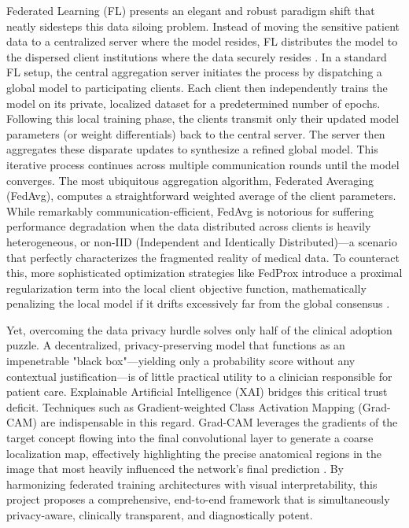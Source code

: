 \documentclass[12pt,a4paper]{report}
\begin{document}
Federated Learning (FL) presents an elegant and robust paradigm shift that neatly sidesteps this data siloing problem. Instead of moving the sensitive patient data to a centralized server where the model resides, FL distributes the model to the dispersed client institutions where the data securely resides \cite{mcmahan2017communication,rieke2020,sheller2020federated}. In a standard FL setup, the central aggregation server initiates the process by dispatching a global model to participating clients. Each client then independently trains the model on its private, localized dataset for a predetermined number of epochs. Following this local training phase, the clients transmit only their updated model parameters (or weight differentials) back to the central server. The server then aggregates these disparate updates to synthesize a refined global model. This iterative process continues across multiple communication rounds until the model converges. The most ubiquitous aggregation algorithm, Federated Averaging (FedAvg), computes a straightforward weighted average of the client parameters. While remarkably communication-efficient, FedAvg is notorious for suffering performance degradation when the data distributed across clients is heavily heterogeneous, or non-IID (Independent and Identically Distributed)---a scenario that perfectly characterizes the fragmented reality of medical data. To counteract this, more sophisticated optimization strategies like FedProx introduce a proximal regularization term into the local client objective function, mathematically penalizing the local model if it drifts excessively far from the global consensus \cite{li2020federated}.

Yet, overcoming the data privacy hurdle solves only half of the clinical adoption puzzle. A decentralized, privacy-preserving model that functions as an impenetrable "black box"---yielding only a probability score without any contextual justification---is of little practical utility to a clinician responsible for patient care. Explainable Artificial Intelligence (XAI) bridges this critical trust deficit. Techniques such as Gradient-weighted Class Activation Mapping (Grad-CAM) are indispensable in this regard. Grad-CAM leverages the gradients of the target concept flowing into the final convolutional layer to generate a coarse localization map, effectively highlighting the precise anatomical regions in the image that most heavily influenced the network's final prediction \cite{selvaraju2017gradcam}. By harmonizing federated training architectures with visual interpretability, this project proposes a comprehensive, end-to-end framework that is simultaneously privacy-aware, clinically transparent, and diagnostically potent.
\end{document}
